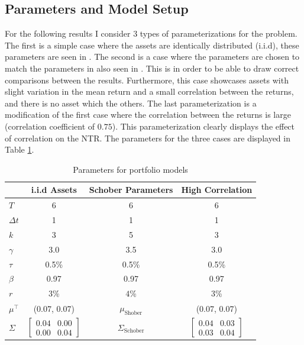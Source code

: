 \documentclass[11pt]{article}
\begin{document}
\subsection{Parameters and Model Setup} \label{Subsection: Parameters}
For the following results I consider 3 types of parameterizations for the problem.
The first is a simple case where the assets are identically distributed (i.i.d), these parameters are seen in \autocite{CaiJuddXu2013}.
The second is a case where the parameters are chosen to match the parameters in \autocite{Schober2022} also seen in \autocite{Scheidegger2023}.
This is in order to be able to draw correct comparisons between the results. Furthermore, this case
showcases assets with slight variation in the mean return and a small correlation between the returns, and there is no asset which the others.
The last parameterization is a modification of the first case where the correlation between the returns is large (correlation coefficient of $0.75$).
This parameterization clearly displays the effect of correlation on the \ac{NTR}. The parameters for the three cases are displayed in Table \ref{table: Parameters_Models}.
\begin{table}[!ht]
    \label{table: Parameters_Base_Models}
    \centering
    \caption{Parameters for portfolio models} \label{table: Parameters_Models}
    \begin{tabular}{lccc}
    \toprule
    & \textbf{i.i.d Assets} & \textbf{Schober Parameters} & \textbf{High Correlation} \\
    \midrule
    $T$        & 6                & 6                & 6                \\
    $\Delta t$ & 1                & 1                & 1                \\
    $k$        & 3                & 5                & 3                \\
    $\gamma$   & 3.0              & 3.5              & 3.0              \\
    $\tau$     & 0.5\%            & 0.5\%            & 0.5\%            \\
    $\beta$    & 0.97             & 0.97             & 0.97             \\
    $r$        & $3$\% & $4$\%    &  $3$\% \\
    $\mu^\top$ & (0.07, 0.07) & $\mu_{\text{Shober}}$ & (0.07, 0.07) \\
    $\Sigma$   & 
    $\begin{bmatrix}
    0.04 & 0.00 \\
    0.00 & 0.04
    \end{bmatrix}$
    & $\Sigma_{\text{Schober}}$ 
    & 
    $\begin{bmatrix}
    0.04 & 0.03\\
    0.03 & 0.04
    \end{bmatrix}$ \\
    \bottomrule
    \end{tabular}
\end{table}
\end{document}
